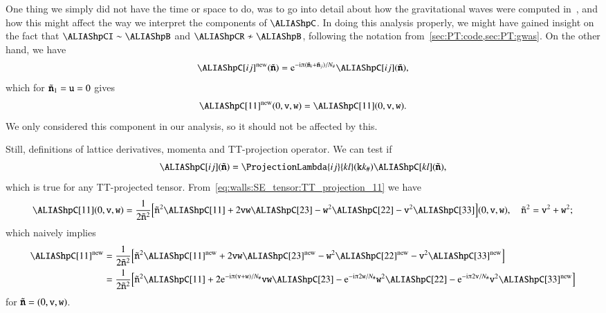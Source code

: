 \section{}
    One thing we simply did not have the time or space to do, was to go into detail about how the gravitational waves were computed in~\asgrd, and how this might affect the way we interpret the components of $\hpC$. 
    In doing this analysis properly, we might have gained insight on the fact that $\hpCI \sim \hpB$ and $\hpCR \not\sim \hpB$, following the notation from~\cref{sec:PT:code,sec:PT:gwas}. On the other hand, we have~\citep{adamekGevolutionCosmologicalNbody2016}
    \begin{equation}
        \hpC[ij]\ap{new}(\lcoordk) = \eu[-\im \ppi (\lcoordk_i + \lcoordk_j)/N_\# ] \hpC[ij](\lcoordk),
    \end{equation}
    which for $\tilde{\boldsymbol{\mathtt{n}}}_1 =\mathtt{u}= 0$ gives 
    \begin{equation}
        \hpC[11]\ap{new}(0,\lcoord{v},\lcoord{w}) = \hpC[11](0,\lcoord{v},\lcoord{w}).
    \end{equation}
    We only considered this component in our analysis, so it should not be affected by this.

    Still, definitions of lattice derivatives, momenta and TT-projection operator. We can test if
    \begin{equation}
        \hpC[ij](\lcoordk) =  \ProjectionLambda{ij}{kl}(\lcoord{k}k_\#) \hpC[kl](\lcoordk),
    \end{equation}
    which is true for any TT-projected tensor. From~\cref{eq:walls:SE_tensor:TT_projection_11} we have
    \begin{equation}
        \hpC[11](0,\lcoord{v},\lcoord{w}) = \frac{1}{2\tilde{\lcoord{n}}^2}  \bclosed{\tilde{\lcoord{n}}^2 \hpC[11] + 2 \lcoord{v}\lcoord{w}\hpC[23] - \lcoord{w}^2 \hpC[22] - \lcoord{v}^2 \hpC[33]  }(0,\lcoord{v},\lcoord{w}) , \quad \tilde{\lcoord{n}}^2 = \lcoord{v}^2 + \lcoord{w}^2;
    \end{equation}
    which naively implies
    \begin{align}
        \hpC[11]\ap{new}&= \frac{1}{2\tilde{\lcoord{n}}^2}  \bclosed{\tilde{\lcoord{n}}^2 \hpC[11]\ap{new} + 2 \lcoord{v}\lcoord{w}\hpC[23]\ap{new} - \lcoord{w}^2 \hpC[22]\ap{new} - \lcoord{v}^2 \hpC[33]\ap{new}  }\nonumber \\
        & = \frac{1}{2\tilde{\lcoord{n}}^2} \bclosed{\tilde{\lcoord{n}}^2 \hpC[11]+ 2 \eu[-\im \ppi (\lcoord{v}+\lcoord{w})/N_\#] \lcoord{v}\lcoord{w}\hpC[23] - \eu[-\im \ppi 2\lcoord{w}/N_\#] \lcoord{w}^2 \hpC[22] - \eu[-\im \ppi 2\lcoord{v}/N_\#]\lcoord{v}^2 \hpC[33]\ap{new}  }
    \end{align}
    for $\tilde{\boldsymbol{\mathtt{n}}} = (0,\mathtt{v},\mathtt{w})$. 
    
